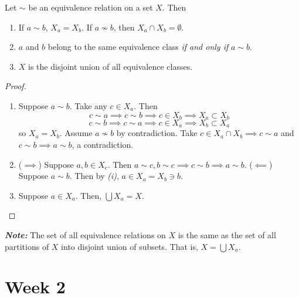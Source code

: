 \documentclass{report}
\newcommand{\textib}[1]{\textit{\textbf{{#1}}}}
\newcommand{\proposition}[1]{\begin{tcolorbox}[title=\textit{Proposition}]{#1}\end{tcolorbox}}
\begin{document}
\proposition {
    Let $\sim$ be an equivalence relation on a set $X$. Then
    \begin{enumerate}[label=\textit{(\roman*)}]
        \item If $a \sim b$, $X_a = X_b$. If $a \not \sim b$, then $X_a \cap X_b = \emptyset$.
        \item $a$ and $b$ belong to the same equivalence class \textit{if and only if} $a \sim b$.
        \item $X$ is the disjoint union of all equivalence classes.
    \end{enumerate}
}
\begin{proof}
    \begin{enumerate}[label=\textit{(\roman*)}]
        \item Suppose $a \sim b$. Take any $c \in X_a$. Then
            \[c \sim a \implies c \sim b \implies c \in X_b \implies X_a \subset X_b\]
            \[c \sim b \implies c \sim a \implies c \in X_a \implies X_b \subset X_a\]
            so $X_a = X_b$.
            \newline
            \newline
            Assume $a \not \sim b$ by contradiction. Take $c \in X_a \cap X_b \implies c \sim a$ and
            $c \sim b \implies a \sim b$, a contradiction.
        \item ($\implies$) Suppose $a, b \in X_c$. Then $a \sim c, b \sim c \implies c \sim b \implies a \sim b$.
            \newline
            \newline
            ($\impliedby$) Suppose $a \sim b$. Then by \textit{(i)}, $a \in X_a = X_b \ni b$.
        \item Suppose $a \in X_a$. Then, $\bigcup X_a = X$.
    \end{enumerate}
\end{proof}
\textib{Note:} The set of all equivalence relations on $X$ is the same as the set of all partitions
of $X$ into disjoint union of subsets. That is, $X = \bigcup X_a$.





\chapter{Week 2}
\end{document}
